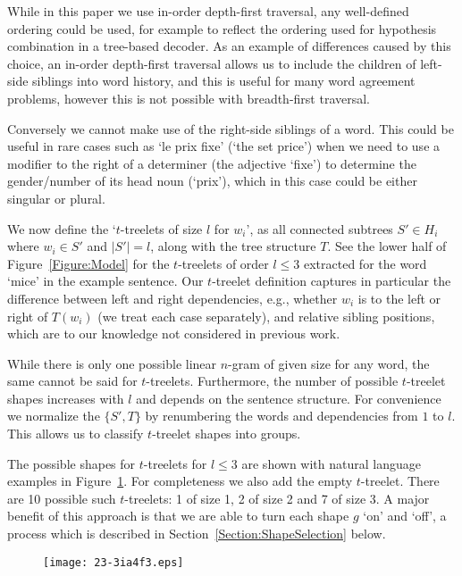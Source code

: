 \documentclass[english]{jnlp_1.4}
\begin{document}
While in this paper we use in-order depth-first traversal, any well-defined ordering
could be used, for example to reflect the ordering used for hypothesis combination
in a tree-based decoder.
As an example of differences caused by this choice, an in-order depth-first traversal
allows us to include the children of left-side siblings into word history, and this is
useful for many word agreement problems, however this is not possible
with breadth-first traversal.

Conversely we cannot make use of the right-side siblings
of a word. This could be useful in rare cases such as `le prix fixe' (`the set price')
when we need to use a modifier to the right of a determiner (the adjective `fixe')
to determine the gender/number of its head noun (`prix'), which in this case could be
either singular or plural.

We now define the `$t$-treelets of size $l$ for $w_i$', as
all connected subtrees $S' \in H_i$ where $w_i \in S'$ and $|S'| = l$, along with
the tree structure $T$. See the lower half of Figure~\ref{Figure:Model} for
the $t$-treelets of order $l \le 3$ extracted for the word `mice' in the example sentence.
Our $t$-treelet definition captures in particular the difference
between left and right dependencies, e.g., whether $w_i$ is to the left or right of
$T(w_i)$ (we treat each case separately), and relative sibling positions, which are to
our knowledge not considered in previous work.

While there is only one possible linear $n$-gram of given size for any word, the
same cannot be said for $t$-treelets. Furthermore, the number of possible
$t$-treelet shapes increases with $l$ and depends on the sentence structure.
For convenience we normalize the $\{S', T\}$ by renumbering the words
and dependencies from $1$ to $l$. This allows us to classify $t$-treelet shapes into
groups.

The possible shapes for $t$-treelets for $l \le 3$ are shown with natural language
examples in Figure~\ref{Figure:Types}. For completeness we also add the empty $t$-treelet.
There are 10 possible such $t$-treelets: 1 of size 1, 2 of size 2 and 7 of size 3.
A major benefit of this approach is that we are able to turn each shape $g$ `on' and `off',
a process which is described in Section~\ref{Section:ShapeSelection} below.

\begin{figure}[b]
\begin{center}
\texttt{[image: 23-3ia4f3.eps]}
\end{center}
\label{Figure:Types}
\end{figure}
\end{document}
